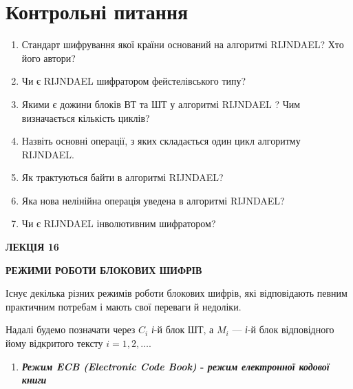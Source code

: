 {{{{{{{{{{{{{{{{{\bigskip


\bigskip

\section{Контрольні питання}


\bigskip


\bigskip

\liststyleWWviiiNumlviii
\begin{enumerate}
\item Стандарт шифрування якої країни оснований на алгоритмі RIJNDAEL? Хто його
автори?
\item Чи є  RIJNDAEL шифратором фейстелівського типу?
\item Якими є дожини блоків ВТ та ШТ у алгоритмі RIJNDAEL ? Чим визначається
кількість циклів?
\item Назвіть основні операції, з яких складається один цикл алгоритму RIJNDAEL.
\item Як трактуються байти в алгоритмі RIJNDAEL?
\item Яка нова нелінійна операція уведена в алгоритмі RIJNDAEL?
\item Чи є RIJNDAEL інволютивним шифратором?
\end{enumerate}

\bigskip


\bigskip


\bigskip

{\bfseries
ЛЕКЦІЯ  16}


\bigskip

{\centering\bfseries
РЕЖИМИ РОБОТИ БЛОКОВИХ ШИФРІВ
\par}


\bigskip


\bigskip

Існує декілька різних режимів роботи блокових шифрів, які відповідають певним
практичним потребам і мають свої переваги й недоліки.

Надалі будемо позначати через  $C_i$ \textit{і}{}-й блок ШТ, а 
$M_i$ --- \textit{і}{}-й блок відповідного йому відкритого тексту 
$i=1,2,\dots$.


\bigskip


\bigskip

\liststyleWWviiiNumxxi
\begin{enumerate}
\item {\centering\bfseries
\textit{Режим }\textit{ECB (Electronic Code Book) }{}- \textit{режим електронної
кодової книги}
\par}
\end{enumerate}

}}}}}}}}}}}}}}}}}
